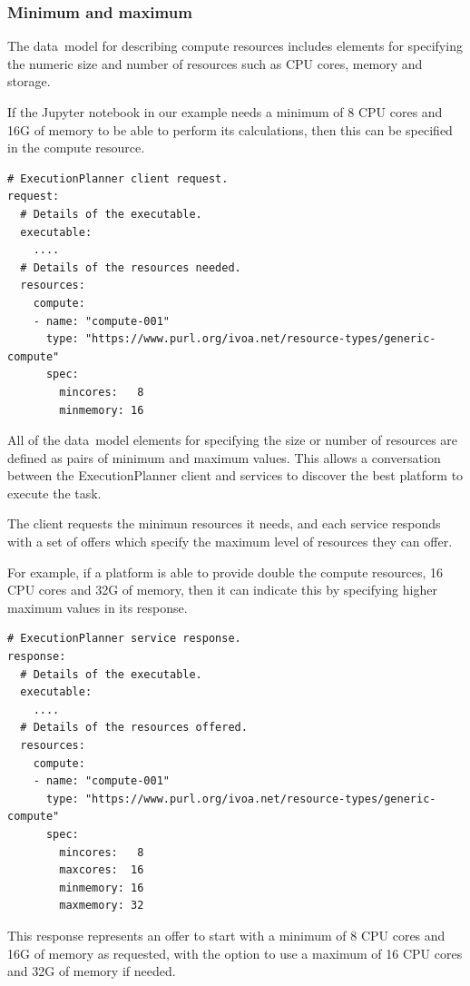 \documentclass[11pt,a4paper]{ivoa}
\newcommand{\datamodel} {data~model}
\newcommand{\execplanner} {ExecutionPlanner}
\newcommand{\jupyternotebook} {Jupyter notebook}
\newcommand{\cpu} {CPU}
\begin{document}
\subsubsection{Minimum and maximum}
\label{minandmax}

The \datamodel{} for describing compute resources includes elements for specifying the numeric size
and number of resources such as \cpu{} cores, memory and storage.

If the \jupyternotebook{} in our example needs a minimum of 8 \cpu{} cores and 16G of memory
to be able to perform its calculations, then this can be specified in the compute resource.

\begin{lstlisting}[]
# ExecutionPlanner client request.
request:
  # Details of the executable.
  executable:
    ....
  # Details of the resources needed.
  resources:
    compute:
    - name: "compute-001"
      type: "https://www.purl.org/ivoa.net/resource-types/generic-compute"
      spec:
        mincores:   8
        minmemory: 16
\end{lstlisting}

All of the \datamodel{} elements for specifying the size or number of resources are defined
as pairs of minimum and maximum values.
This allows a conversation between the \execplanner{} client and services
to discover the best platform to execute the task.

The client requests the minimun resources it needs,
and each service responds with a set of offers which specify the maximum
level of resources they can offer.

For example, if a platform is able to provide double the compute resources,
16 \cpu{} cores and 32G of memory,
then it can indicate this by specifying higher maximum values in its response.

\begin{lstlisting}[]
# ExecutionPlanner service response.
response:
  # Details of the executable.
  executable:
    ....
  # Details of the resources offered.
  resources:
    compute:
    - name: "compute-001"
      type: "https://www.purl.org/ivoa.net/resource-types/generic-compute"
      spec:
        mincores:   8
        maxcores:  16
        minmemory: 16
        maxmemory: 32
\end{lstlisting}

This response represents an offer to start with a minimum of 8 \cpu{} cores and 16G of memory
as requested, with the option to use a maximum of 16 \cpu{} cores and 32G of memory if needed.
\end{document}
